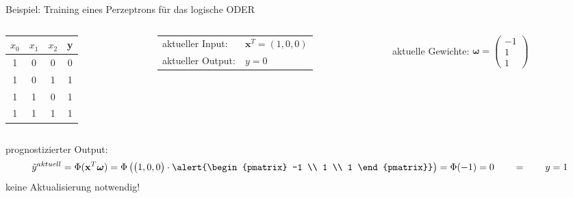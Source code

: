 \documentclass[11pt, aspectratio=169, t]{beamer}
\begin{document}
\begin{frame}{Beispiel: Training eines Perzeptrons für das logische ODER}
\begin{small}
\begin{columns}
\begin{column}{0.25\textwidth}
\hspace{0.5cm}
\begin{footnotesize}
\begin{tabular}{cccc} \toprule
$x_0$ & $x_1$ & $x_2$ & y \\ \midrule
1 & 0 & 0 & 0 \\
1 & 0 & 1 & 1 \\
1 & 1 & 0 & 1 \\
1 & 1 & 1 & 1 \\ \bottomrule
\end{tabular} \end{footnotesize}
\end{column}
\begin{column}{0.4\textwidth}
\begin{tabular}{ll}
aktueller Input: & $\mathbf{x}^{T} = (1, 0, 0)$ \\
aktueller Output: & $y=0$ \\
\end{tabular}
\end{column}
\begin{column}{0.4\textwidth}
aktuelle Gewichte: \alert{ $\boldsymbol{\omega} = \begin{pmatrix} -1 \\ 1 \\ 1 \end{pmatrix}$ }
\end{column}
\end{columns}
prognostizierter Output:
\[\hat{y}^{aktuell} = \Phi(\mathbf{x}^{T}\boldsymbol{\omega}) = \Phi\left( \begin{pmatrix} 1, 0, 0 \end{pmatrix}\cdot \alert{\begin{pmatrix} -1 \\ 1 \\ 1 \end{pmatrix}} \right) = \Phi(-1) = 0 \qquad = \qquad y = 1\]
keine Aktualisierung notwendig!
\begin{align*} %
\phantom{\omega_0^{\text{neu}}} & \\
\phantom{\omega_1^{\text{neu}}} & \\
\phantom{\omega_2^{\text{neu}}} &
\end{align*}
\end{small}
\end{frame}
\end{document}
